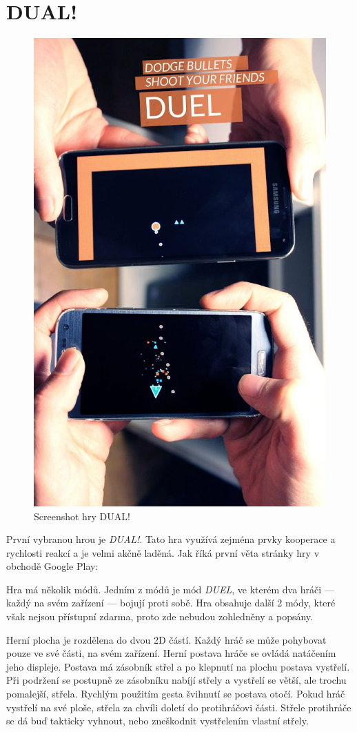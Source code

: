 \section{DUAL!}

\begin{figure}
    \centering
    \includegraphics[width=0.5\linewidth]{assets/competitive-apps/dual.jpg}
    \caption{Screenshot hry DUAL!~\cite{seabaa_dual}}
    \label{fig:dual}
\end{figure}

První vybranou hrou je \emph{DUAL!}.
Tato hra využívá zejména prvky kooperace a rychlosti reakcí
a je velmi akčně laděná.
Jak říká první věta stránky hry v obchodě Google Play:
~\cite{seabaa_dual}

Hra má několik módů.
Jedním z módů je mód \emph{DUEL}, ve kterém dva hráči
--- každý na svém zařízení ---
bojují proti sobě.
Hra obsahuje další 2 módy, které však nejsou přístupní zdarma,
proto zde nebudou zohledněny a popsány.

Herní plocha je rozdělena do dvou 2D částí.
Každý hráč se může pohybovat pouze ve své části, na svém zařízení.
Herní postava hráče se ovládá natáčením jeho displeje.
Postava má zásobník střel a po klepnutí na plochu postava vystřelí.
Při podržení se postupně ze zásobníku nabíjí střely
a vystřelí se větší, ale trochu pomalejší, střela.
Rychlým použitím gesta švihnutí se postava otočí.
Pokud hráč vystřelí na své ploše,
střela za chvíli doletí do protihráčovi části.
Střele protihráče se dá buď takticky vyhnout,
nebo zneškodnit vystřelením vlastní střely.


